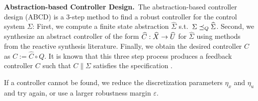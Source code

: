 \smallskip
\noindent\textbf{Abstraction-based Controller Design.}\
The abstraction-based controller design (ABCD) \cite{reissig2016feedback} is a $3$-step method to find a robust controller for the control system $\Sigma$:
First, we compute a finite state abstraction $\widehat{\Sigma}$ s.t.\ $\Sigma \preceq_{Q} \widehat{\Sigma}$.
Second, we synthesize an abstract controller of the form $\widehat{C}:\widehat{X}\rightarrow \widehat{U}$ for $\widehat{\Sigma}$ using methods from the reactive synthesis literature.
Finally, we obtain the desired controller $C$ as $C:=\widehat{C}\circ Q$.
It is known that this three step process produces a feedback controller $C$ such that $C\parallel \Sigma$ satisfies the specification \cite{reissig2016feedback}.

If a controller cannot be found, we reduce the discretization parameters $\eta_x$ and $\eta_u$ and try again,
or use a larger robustness margin $\varepsilon$.




